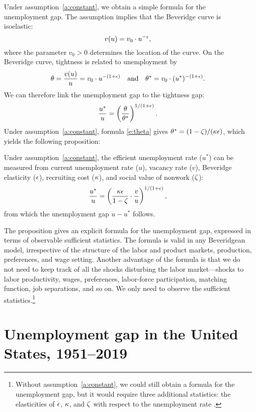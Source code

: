 \documentclass[letterpaper,12pt,leqno]{article}
\begin{document}
Under assumption~\ref{a:constant}, we obtain a simple formula for the unemployment gap. The assumption implies that the Beveridge curve is isoelastic:
\begin{equation}
 v(u)=v_0 \cdot u^{-\epsilon},
\label{e:iso}\end{equation}
where the parameter $v_0>0$ determines the location of the curve. On the Beveridge curve, tightness is related to unemployment by 
\begin{equation*}
\theta = \frac{v(u)}{u} = v_0 \cdot u^{-(1+\epsilon)}\quad\text{and}\quad \theta^* = v_0 \cdot (u^*)^{-(1+\epsilon)}. 
\end{equation*}
We can therefore link the unemployment gap to the tightness gap:
\begin{equation}
\frac{u^*}{u} = \left( \frac{\theta}{\theta^*} \right)^{1/(1+\epsilon)}.
\label{e:link}\end{equation}
Under assumption~\ref{a:constant}, formula \eqref{e:theta} gives $\theta^* = (1-\zeta)/(\kappa\epsilon)$, which yields the following proposition:

\begin{proposition}\label{p:u} Under assumption~\ref{a:constant}, the efficient unemployment rate ($u^*$) can be measured from current unemployment rate ($u$), vacancy rate ($v$), Beveridge elasticity ($\epsilon$), recruiting cost ($\kappa$), and social value of nonwork ($\zeta$):
\begin{equation}
\frac{u^*}{u} = \left( \frac{\kappa \epsilon}{1-\zeta}\cdot\frac{v}{u} \right)^{1/(1+\epsilon)},
\label{e:u}\end{equation}
from which the unemployment gap $u-u^*$ follows.
\end{proposition} 

The proposition gives an explicit formula for the unemployment gap, expressed in terms of observable sufficient statistics. The formula is valid in any Beveridgean model, irrespective of the structure of the labor and product markets, production, preferences, and wage setting. Another advantage of the formula is that we do not need to keep track of all the shocks disturbing the labor market---shocks to labor productivity, wages, preferences, labor-force participation, matching function, job separations, and so on. We only need to observe the sufficient statistics.\footnote{Without assumption~\ref{a:constant}, we could still obtain a formula for the unemployment gap, but it would require three additional statistics: the elasticities of $\epsilon$, $\kappa$, and $\zeta$ with respect to the unemployment rate .}

\section{Unemployment gap in the United States, 1951--2019}\label{s:usa}
\end{document}
